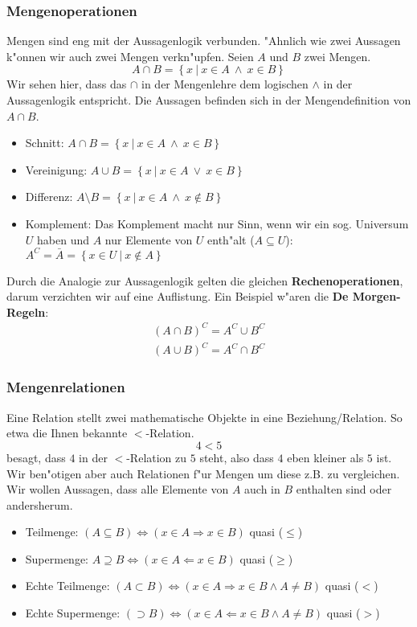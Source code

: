 \subsubsection{Mengenoperationen}
Mengen sind eng mit der Aussagenlogik verbunden. "Ahnlich wie zwei Aussagen k"onnen wir auch zwei Mengen verkn"upfen. Seien $A$ und $B$ zwei Mengen.
\begin{equation*}
A \cap B = \left\{ x \ | \ x \in A \ \land \ x \in B \right\}
\end{equation*}
Wir sehen hier, dass das $\cap$ in der Mengenlehre dem logischen $\land$ in der Aussagenlogik entspricht. Die Aussagen  befinden sich in der Mengendefinition von $A \cap B$.
\begin{itemize}
\item Schnitt: $A \cap B =  \left\{x \ | \ x \in A \ \land \ x \in B \right\}$
\item Vereinigung: $A \cup B =  \left\{x \ | \ x \in A \ \lor \ x \in B \right\}$
\item Differenz: $A \setminus B =  \left\{x \ | \ x \in A \ \land \ x \notin B \right\}$
\item Komplement: Das Komplement macht nur Sinn, wenn wir ein sog. Universum $U$ haben und $A$ nur Elemente von $U$ enth"alt ($A \subseteq U$): $A^C = \bar{A} = \left\{x \in U \ | \ x \notin A \right\}$
\end{itemize}
Durch die Analogie zur Aussagenlogik gelten die gleichen \textbf{Rechenoperationen}, darum verzichten wir auf eine Auflistung. Ein Beispiel w"aren die \textbf{De Morgen-Regeln}:
\begin{gather*}
(A \cap B)^C = A^C \cup B^C \\
(A \cup B)^C = A^C \cap B^C 
\end{gather*} 

\subsubsection{Mengenrelationen}
Eine Relation stellt zwei mathematische Objekte in eine Beziehung/Relation. So etwa die Ihnen bekannte $<$-Relation.
\begin{equation*}
4 < 5
\end{equation*}
besagt, dass $4$ in der $<$-Relation zu $5$ steht, also dass $4$ eben kleiner als $5$ ist. Wir ben"otigen aber auch Relationen f"ur Mengen um diese z.B. zu vergleichen. Wir wollen Aussagen, dass alle Elemente von $A$ auch in $B$ enthalten sind oder andersherum.
\begin{itemize}
\item Teilmenge: $(A \subseteq B) \iff (x \in A \Rightarrow x \in B)$ quasi ($\leq$)
\item Supermenge: $A \supseteq B  \iff (x \in A \Leftarrow x \in B)$ quasi ($\geq$)
\item Echte Teilmenge: $(A \subset B) \iff (x \in A \Rightarrow x \in B \land A \neq B)$ quasi ($<$)
\item Echte Supermenge: $(\supset B) \iff (x \in A \Leftarrow x \in B \land A \neq B)$ quasi ($>$)
\end{itemize}


